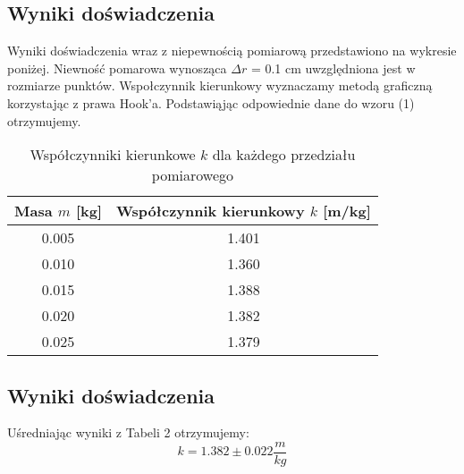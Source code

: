 \documentclass{article} %
\begin{document}
\subsection{Wyniki doświadczenia}
Wyniki doświadczenia wraz z niepewnością pomiarową przedstawiono na wykresie poniżej. Niewność pomarowa wynosząca $\Delta r$ = 0.1 cm uwzględniona jest w rozmiarze punktów. Wspołczynnik kierunkowy wyznaczamy metodą graficzną korzystając z prawa Hook'a. Podstawiąjąc odpowiednie dane do wzoru (1) otrzymujemy.
{
\begin{center}



\begin{table}[h!]
\centering

\label{tab:coefficients}

\begin{tabular}{|c|c|}
\hline
\textbf{Masa \( m \) [kg]} & \textbf{Współczynnik kierunkowy \( k \) [m/kg]} \\ 
\hline
0.005 & 1.401 \\ 
0.010 & 1.360\\ 
0.015 & 1.388 \\ 
0.020 & 1.382 \\
0.025 & 1.379 \\
\hline
\end{tabular}
\caption{Współczynniki kierunkowe \( k \) dla każdego przedziału pomiarowego}
\end{table}
\end{center}
}
\subsection{Wyniki doświadczenia}

Uśredniając wyniki z Tabeli 2 otrzymujemy:
{\large
\begin{equation}
    k = 1.382 \pm0.022 \frac{m}{kg}
\end{equation}
}
\end{document}
